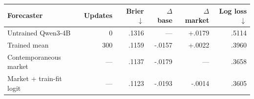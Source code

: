 \begin{tabular}{lrrrrr}
\toprule
Forecaster & Updates & Brier $\downarrow$ & $\Delta$ base & $\Delta$ market & Log loss $\downarrow$ \\
\midrule
Untrained Qwen3-4B       & 0   & .1316 & ---    & +.0179 & .5114 \\
Trained mean             & 300 & .1159 & -.0157 & +.0022 & .3960 \\
\midrule
Contemporaneous market   & --- & .1137 & -.0179 & ---    & .3658 \\
Market + train-fit logit & --- & .1123 & -.0193 & -.0014 & .3605 \\
\bottomrule
\end{tabular}
